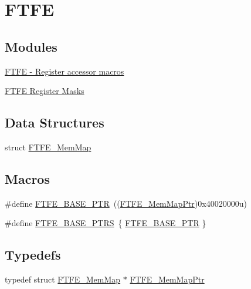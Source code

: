 \hypertarget{group___f_t_f_e___peripheral}{}\section{F\+T\+F\+E}
\label{group___f_t_f_e___peripheral}
\subsection*{Modules}
\begin{DoxyCompactItemize}
\item 
\hyperlink{group___f_t_f_e___register___accessor___macros}{F\+T\+F\+E -\/ Register accessor macros}
\item 
\hyperlink{group___f_t_f_e___register___masks}{F\+T\+F\+E Register Masks}
\end{DoxyCompactItemize}
\subsection*{Data Structures}
\begin{DoxyCompactItemize}
\item 
struct \hyperlink{struct_f_t_f_e___mem_map}{F\+T\+F\+E\+\_\+\+Mem\+Map}
\end{DoxyCompactItemize}
\subsection*{Macros}
\begin{DoxyCompactItemize}
\item 
\#define \hyperlink{group___f_t_f_e___peripheral_ga459f4097b9fd3f09e7bf790c17831f83}{F\+T\+F\+E\+\_\+\+B\+A\+S\+E\+\_\+\+P\+T\+R}~((\hyperlink{group___f_t_f_e___peripheral_gad81b9269a2ee19ce1983daae49ba1694}{F\+T\+F\+E\+\_\+\+Mem\+Map\+Ptr})0x40020000u)
\item 
\#define \hyperlink{group___f_t_f_e___peripheral_ga5ae2dee20c785365da3d603faf7a1dd2}{F\+T\+F\+E\+\_\+\+B\+A\+S\+E\+\_\+\+P\+T\+R\+S}~\{ \hyperlink{group___f_t_f_e___peripheral_ga459f4097b9fd3f09e7bf790c17831f83}{F\+T\+F\+E\+\_\+\+B\+A\+S\+E\+\_\+\+P\+T\+R} \}
\end{DoxyCompactItemize}
\subsection*{Typedefs}
\begin{DoxyCompactItemize}
\item 
typedef struct \hyperlink{struct_f_t_f_e___mem_map}{F\+T\+F\+E\+\_\+\+Mem\+Map} $\ast$ \hyperlink{group___f_t_f_e___peripheral_gad81b9269a2ee19ce1983daae49ba1694}{F\+T\+F\+E\+\_\+\+Mem\+Map\+Ptr}
\end{DoxyCompactItemize}


